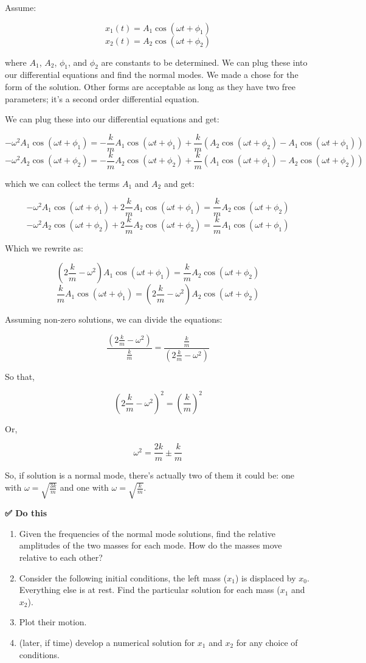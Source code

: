Assume:

\[x_1(t) = A_1\cos(\omega t + \phi_1)\]
\[x_2(t) = A_2\cos(\omega t + \phi_2)\]

where \(A_1\), \(A_2\), \(\phi_1\), and \(\phi_2\) are constants to be
determined. We can plug these into our differential equations and find
the normal modes. We made a chose for the form of the solution. Other
forms are acceptable as long as they have two free parameters; it's a
second order differential equation.

We can plug these into our differential equations and get:

\[-\omega^2A_1\cos(\omega t + \phi_1) = -\frac{k}{m}A_1\cos(\omega t + \phi_1) + \frac{k}{m}(A_2\cos(\omega t + \phi_2)-A_1\cos(\omega t + \phi_1))\]
\[-\omega^2A_2\cos(\omega t + \phi_2) = -\frac{k}{m}A_2\cos(\omega t + \phi_2) + \frac{k}{m}(A_1\cos(\omega t + \phi_1)-A_2\cos(\omega t + \phi_2))\]

which we can collect the terms \(A_1\) and \(A_2\) and get:

\[-\omega^2A_1\cos(\omega t + \phi_1) + 2\frac{k}{m}A_1\cos(\omega t + \phi_1) = \frac{k}{m}A_2\cos(\omega t + \phi_2)\]
\[-\omega^2A_2\cos(\omega t + \phi_2) + 2\frac{k}{m}A_2\cos(\omega t + \phi_2) = \frac{k}{m}A_1\cos(\omega t + \phi_1)\]

Which we rewrite as:

\[\left(2\frac{k}{m}-\omega^2\right)A_1\cos(\omega t + \phi_1) = \frac{k}{m}A_2\cos(\omega t + \phi_2)\]
\[\frac{k}{m}A_1\cos(\omega t + \phi_1)=\left(2\frac{k}{m}-\omega^2\right)A_2\cos(\omega t + \phi_2)\]

Assuming non-zero solutions, we can divide the equations:

\[\dfrac{\left(2\frac{k}{m}-\omega^2\right)}{\frac{k}{m}} = \dfrac{\frac{k}{m}}{\left(2\frac{k}{m}-\omega^2\right)}\]

So that,

\[\left(2\frac{k}{m}-\omega^2\right)^2 = \left(\frac{k}{m}\right)^2\]

Or,

\[\omega^2 = \frac{2k}{m} \pm \frac{k}{m}\]

So, if solution is a normal mode, there's actually two of them it could
be: one with \(\omega = \sqrt{\frac{3k}{m}}\) and one with
\(\omega = \sqrt{\frac{k}{m}}\).

\textbf{✅ Do this}

\begin{enumerate}
\def\labelenumi{\arabic{enumi}.}
\tightlist
\item
  Given the frequencies of the normal mode solutions, find the relative
  amplitudes of the two masses for each mode. How do the masses move
  relative to each other?
\item
  Consider the following initial conditions, the left mass (\(x_1\)) is
  displaced by \(x_0\). Everything else is at rest. Find the particular
  solution for each mass (\(x_1\) and \(x_2\)).
\item
  Plot their motion.
\item
  (later, if time) develop a numerical solution for \(x_1\) and \(x_2\)
  for any choice of conditions.
\end{enumerate}

